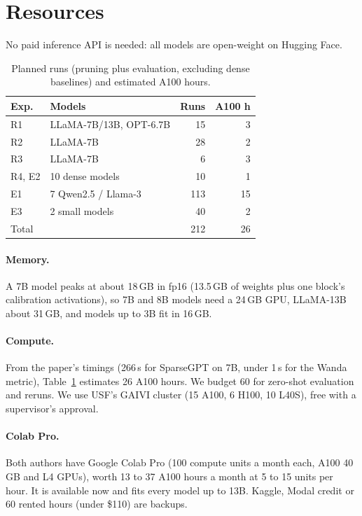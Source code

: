 \documentclass[11pt]{article}
\begin{document}
\section{Resources}

No paid inference API is needed: all models are open-weight on Hugging Face.

\begin{table}[t]
\centering
\small
\begin{tabular}{llrr}
\toprule
Exp. & Models & Runs & A100 h \\
\midrule
R1 & LLaMA-7B/13B, OPT-6.7B & 15 & 3 \\
R2 & LLaMA-7B & 28 & 2 \\
R3 & LLaMA-7B & 6 & 3 \\
R4, E2 & 10 dense models & 10 & 1 \\
E1 & 7 Qwen2.5 / Llama-3 & 113 & 15 \\
E3 & 2 small models & 40 & 2 \\
\midrule
Total & & 212 & 26 \\
\bottomrule
\end{tabular}
\caption{Planned runs (pruning plus evaluation, excluding dense baselines) and estimated A100 hours.}
\label{tab:budget}
\end{table}

\paragraph{Memory.} A 7B model peaks at about 18\,GB in fp16 (13.5\,GB of weights plus one block's calibration activations), so 7B and 8B models need a 24\,GB GPU, LLaMA-13B about 31\,GB, and models up to 3B fit in 16\,GB.

\paragraph{Compute.} From the paper's timings (266\,s for SparseGPT on 7B, under 1\,s for the Wanda metric), Table~\ref{tab:budget} estimates 26 A100 hours. We budget 60 for zero-shot evaluation and reruns. We use USF's GAIVI cluster (15 A100, 6 H100, 10 L40S), free with a supervisor's approval.

\paragraph{Colab Pro.} Both authors have Google Colab Pro (100 compute units a month each, A100 40\,GB and L4 GPUs), worth 13 to 37 A100 hours a month at 5 to 15 units per hour. It is available now and fits every model up to 13B. Kaggle, Modal credit or 60 rented hours (under \$110) are backups.

\clearpage

\end{document}
